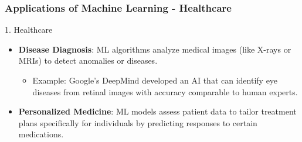 \documentclass[aspectratio=169]{beamer}
\begin{document}
\begin{frame}[fragile]
  \frametitle{Applications of Machine Learning - Healthcare}
  \begin{block}{1. Healthcare}
    \begin{itemize}
      \item \textbf{Disease Diagnosis}: ML algorithms analyze medical images (like X-rays or MRIs) to detect anomalies or diseases.
        \begin{itemize}
          \item Example: Google's DeepMind developed an AI that can identify eye diseases from retinal images with accuracy comparable to human experts.
        \end{itemize}
      \item \textbf{Personalized Medicine}: ML models assess patient data to tailor treatment plans specifically for individuals by predicting responses to certain medications.
    \end{itemize}
  \end{block}
\end{frame}
\end{document}
